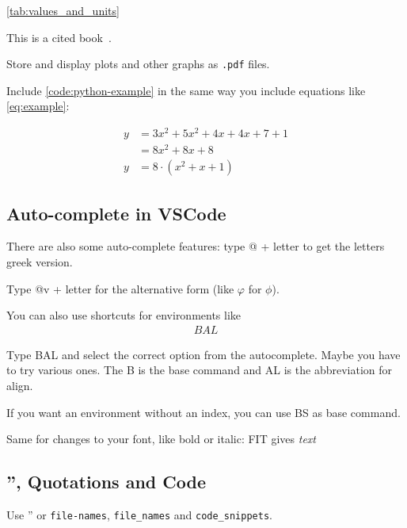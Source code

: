 \autoref{tab:values_and_units}

This is a cited book~\cite{latex-template}.

Store and display plots and other graphs as \texttt{.pdf} files.

Include \autoref{code:python-example} in the same way you include equations like \autoref{eq:example}:

\begin{align}\label{eq:example}
    y & = 3 x^2 + 5 x^2 + 4 x + 4 x + 7 + 1 \nonumber \\
      & = 8 x^2 +         8 x  +      8     \nonumber \\
    y & = 8 \cdot (x^2 +  x +         1 )
\end{align}

\subsection{Auto-complete in VSCode}

There are also some auto-complete features: type @ + letter to get the letters greek version.

Type @v + letter for the alternative form (like \(\varphi\) for \(\phi\)). %

You can also use shortcuts for environments like
\begin{align}
    BAL
\end{align}

Type BAL and select the correct option from the autocomplete. Maybe you have to try various ones.
The B is the base command and AL is the abbreviation for align.

If you want an environment without an index, you can use BS as base command.

Same for changes to your font, like bold or italic:
FIT gives \textit{text}

\subsection{'', Quotations and Code}

Use '' or \texttt{file-names}, \verb|file_names| and \verb+code_snippets+.



